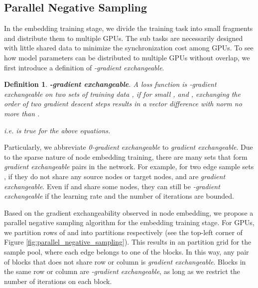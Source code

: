\documentclass[sigconf]{acmart}
\newcommand{\property}[1]{\textit{#1}}
\newtheorem{definition}{Definition}
\begin{document}
\subsection{Parallel Negative Sampling}
\label{sec:parallel_training}

In the embedding training stage, we divide the training task into small fragments and distribute them to multiple GPUs. The sub tasks are necessarily designed with little shared data to minimize the synchronization cost among GPUs. To see how model parameters can be distributed to multiple GPUs without overlap, we first introduce a definition of \property{-gradient exchangeable}.

\begin{definition}
    \textbf{-gradient exchangeable}. A loss function  is \property{-gradient exchangeable} on two sets of training data ,  if for small ,  and , exchanging the order of two gradient descent steps results in a vector difference with norm no more than .
    
    
    i.e.  is true for the above equations.
\end{definition}

Particularly, we abbreviate \property{0-gradient exchangeable} to \property{gradient exchangeable}. Due to the sparse nature of node embedding training, there are many sets that form \property{gradient exchangeable} pairs in the network. For example, for two edge sample sets , if they do not share any source nodes or target nodes,  and  are \property{gradient exchangeable}. Even if  and  share some nodes, they can still be \property{-gradient exchangeable} if the learning rate  and the number of iterations are bounded.

Based on the gradient exchangeability observed in node embedding, we propose a parallel negative sampling algorithm for the embedding training stage. For  GPUs, we partition rows of  and  into  partitions respectively (see the top-left corner of Figure \ref{fig:parallel_negative_sampling}). This results in an  partition grid for the sample pool, where each edge belongs to one of the blocks. In this way, any pair of blocks that does not share row or column is \property{gradient exchangeable}. Blocks in the same row or column are \property{-gradient exchangeable}, as long as we restrict the number of iterations on each block.
\end{document}
